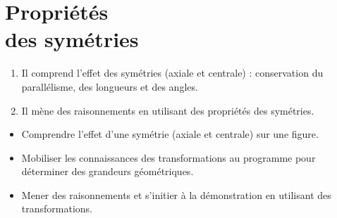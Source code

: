 \themaM
\graphicspath{{../../S29_Proprietes_des_symetries/Images/}}

\chapter{Propriétés\\des symétries}
\label{S29}

   \def\cocottea{\pspolygon(0,0)(0.5,0)(0.75,0.25)(1,0)(1,0.5)(0.75,0.75)(1,1)(0.5,1)(0.5,0.5)}
   \def\cocotteb{\pspolygon[fillstyle=solid,fillcolor=lightgray](0,0)(0.5,0)(0.75,0.25)(1,0)(1,0.5)(0.75,0.75)(1,1)(0.5,1)(0.5,0.5)}
   \def\cocottec{\pspolygon[fillstyle=solid,fillcolor=lightgray](0,0)(-0.5,0)(-0.75,0.25)(-1,0)(-1,0.5)(-0.75,.75)(-1,1)(-0.5,1)(-0.5,0.5)}   
   \newcommand{\Syst}[2]{\renewcommand{\arraystretch}{1}\left\{\begin{array}{ccccc} #1\\ #2 \end{array}\right.}
    
    
\begin{autoeval}
   \small
   \begin{enumerate}
      \item Il comprend l’effet des symétries (axiale et centrale) : conservation du parallélisme, des longueurs et des angles.
      \item Il mène des raisonnements en utilisant des propriétés des symétries.
   \end{enumerate}
\end{autoeval}

\begin{prerequis}
   \begin{itemize}
      \item[\com] Comprendre l’effet d’une symétrie (axiale et centrale) sur une figure.
      \item[\com] Mobiliser les connaissances des transformations au programme pour déterminer des grandeurs géométriques.
      \item[\com] Mener des raisonnements et s’initier à la démonstration en utilisant des transformations.
   \end{itemize}
\end{prerequis}

\vfill

